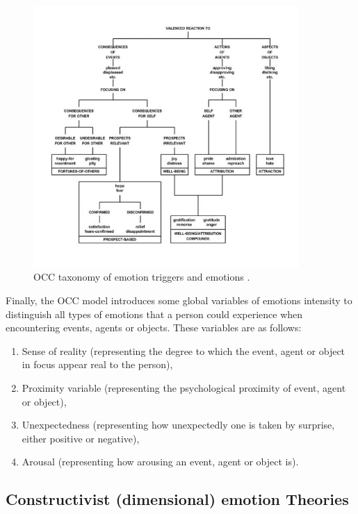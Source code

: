 \documentclass[11pt]{article}
\begin{document}
\begin{figure}[tbh]
  \center
  \includegraphics[width=0.9\textwidth]{figure/occ-structure.jpg}
  \caption{OCC taxonomy of emotion triggers and emotions \cite{occ:structure}.}
  \label{fig:occ-structure}
\end{figure}

Finally, the OCC model introduces some global variables of emotions intensity to
distinguish all types of emotions that a person could experience when
encountering events, agents or objects. These variables are as follows:

\begin{enumerate}
	\item Sense of reality (representing the degree to which the event, agent or
	object in focus appear real to the person),

	\item Proximity variable (representing the psychological proximity of event,
	agent or object),

	\item Unexpectedness (representing how unexpectedly one is taken by surprise,
	either positive or negative),

	\item Arousal (representing how arousing an event, agent or object is).
\end{enumerate}

\subsection{Constructivist (dimensional) emotion Theories}
\end{document}
